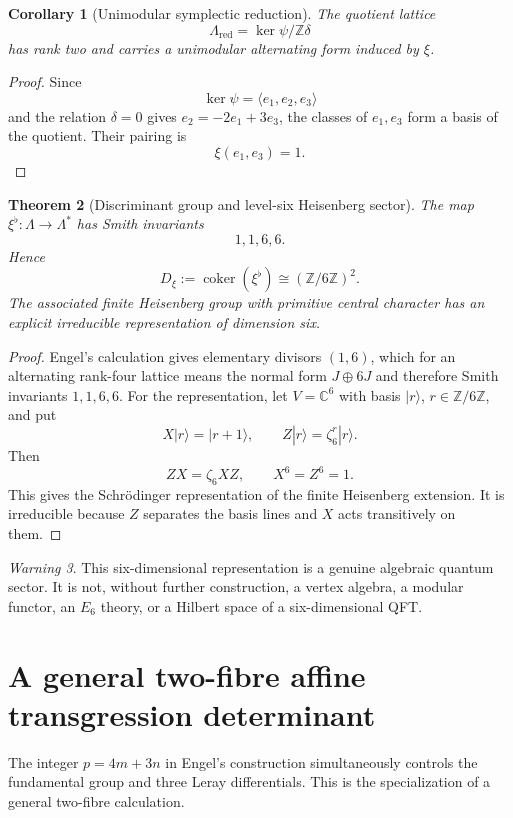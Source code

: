 \documentclass[11pt]{article}
\newtheorem{theorem}{Theorem}[section]
\newtheorem{corollary}[theorem]{Corollary}
\theoremstyle{definition}
\theoremstyle{remark}
\newtheorem{warning}[theorem]{Warning}
\DeclareMathOperator{\coker}{coker}
\newcommand{\ZZ}{\mathbb Z}
\newcommand{\CC}{\mathbb C}
\newcommand{\1}{\mathbf 1}
\begin{document}
\begin{corollary}[Unimodular symplectic reduction]
The quotient lattice
\[
\Lambda_{\mathrm{red}}=\ker\psi/\ZZ\delta
\]
has rank two and carries a unimodular alternating form induced by $\xi$.
\end{corollary}

\begin{proof}
Since
\[
\ker\psi=\langle e_1,e_2,e_3\rangle
\]
and the relation $\delta=0$ gives $e_2=-2e_1+3e_3$, the classes of $e_1,e_3$ form a basis of the quotient.  Their pairing is
\[
\xi(e_1,e_3)=1.
\]
\end{proof}

\begin{theorem}[Discriminant group and level-six Heisenberg sector]
The map $\xi^\flat:\Lambda\to\Lambda^*$ has Smith invariants
\[
1,1,6,6.
\]
Hence
\[
D_\xi:=\coker(\xi^\flat)\cong(\ZZ/6\ZZ)^2.
\]
The associated finite Heisenberg group with primitive central character has an explicit irreducible representation of dimension six.
\end{theorem}

\begin{proof}
Engel's calculation gives elementary divisors $(1,6)$, which for an alternating rank-four lattice means the normal form $J\oplus6J$ and therefore Smith invariants $1,1,6,6$.  For the representation, let $V=\CC^6$ with basis $|r\rangle$, $r\in\ZZ/6\ZZ$, and put
\[
X|r\rangle=|r+1\rangle,
\qquad
Z|r\rangle=\zeta_6^r|r\rangle.
\]
Then
\[
ZX=\zeta_6XZ,
\qquad X^6=Z^6=1.
\]
This gives the Schr\"odinger representation of the finite Heisenberg extension.  It is irreducible because $Z$ separates the basis lines and $X$ acts transitively on them.
\end{proof}

\begin{warning}
This six-dimensional representation is a genuine algebraic quantum sector.  It is not, without further construction, a vertex algebra, a modular functor, an $E_6$ theory, or a Hilbert space of a six-dimensional QFT.
\end{warning}

\section{A general two-fibre affine transgression determinant}

The integer $p=4m+3n$ in Engel's construction simultaneously controls the fundamental group and three Leray differentials.  This is the specialization of a general two-fibre calculation.
\end{document}
